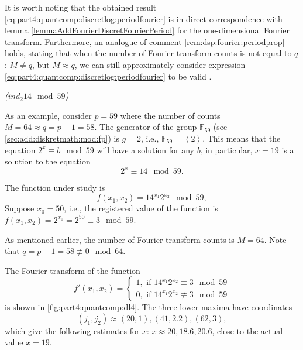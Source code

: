 It is worth noting that the obtained result \eqref{eq:part4:quantcomp:discretlog:periodfourier} is in direct correspondence with lemma \ref{lemmaAddFourierDiscretFourierPeriod} for the one-dimensional Fourier transform. Furthermore, an analogue of comment \ref{rem:dsp:fourier:periodprop} holds, stating that when the number of Fourier transform counts is not equal to $q$: $M \ne q$, but $M \approx q$, we can still approximately consider expression \eqref{eq:part4:quantcomp:discretlog:periodfourier} to be valid \cite{Proos:2003:SDL:2011528.2011531}.  

\begin{example}
\emph{($ind_2{14} \mod{59}$)}

As an example, consider $p = 59$ where the number of counts $M = 64 \approx q = p - 1 = 58$. The generator of the group $\mathbb{F}_{59}$ (see \autoref{sec:add:diskretmath:mod:fp}) is $g = 2$, i.e., $\mathbb{F}_{59} = \left<2\right>$. This means that the equation $2^x \equiv b \mod 59$ will have a solution for any $b$, in particular, $x = 19$ is a solution to the equation
\[
2^x \equiv 14 \mod 59.
\] 

The function under study is
\[
f(x_1, x_2) = 14^{x_1} 2^{x_2} \mod 59,
\]
Suppose $x_0 = 50$, i.e., the registered value of the function is $f(x_1, x_2) = 2^{x_0} = 2^{50} \equiv 3 \mod 59$.



As mentioned earlier, the number of Fourier transform counts is $M=64$. Note that $q = p - 1 = 58 \not\equiv 0 \mod 64$.

The Fourier transform of the function 
\[
f'(x_1, x_2) = 
\begin{cases}
1, \mbox{ if } 14^{x_1} 2^{x_2} \equiv 3 \mod 59 \\
0, \mbox{ if } 14^{x_1} 2^{x_2} \not\equiv 3 \mod 59 
\end{cases}
\]
is shown in \autoref{fig:part4:quantcomp:dl4}. 
The three lower maxima have coordinates 
\[
(j_1, j_2) \approx (20,1), (41,2.2), (62,3), 
\]
which give the following estimates for $x$: $x \approx 20, 18.6, 20.6$, close to the actual value $x = 19$.
\label{ex:part4:quantcomp:discretlog:periodfinding3}
\end{example}

